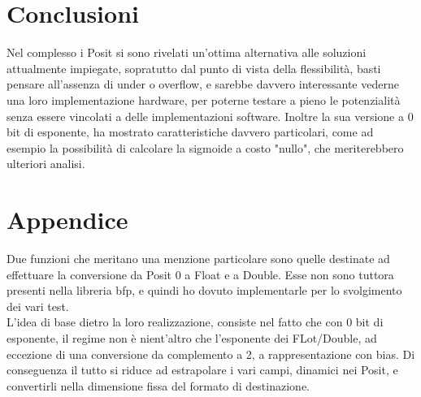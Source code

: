 \documentclass[a4paper,11pt]{article}
\begin{document}
\newpage
\section{Conclusioni}
Nel complesso i Posit si sono rivelati un'ottima alternativa alle soluzioni attualmente impiegate, sopratutto dal punto di vista della flessibilità, basti pensare all'assenza di under o overflow, e sarebbe davvero interessante vederne una loro implementazione hardware, per poterne testare a pieno le potenzialità senza essere vincolati a delle implementazioni software. Inoltre la sua versione a 0 bit di esponente, ha mostrato caratteristiche davvero particolari, come ad esempio la possibilità di calcolare la sigmoide a costo "nullo", che meriterebbero ulteriori analisi.

\newpage

\section{Appendice}
Due funzioni che meritano una menzione particolare sono quelle destinate ad effettuare la conversione da Posit 0 a Float e a Double. Esse non sono tuttora presenti nella libreria bfp\cite{libbfp}, e quindi ho dovuto implementarle per lo svolgimento dei vari test.\\ L'idea di base dietro la loro realizzazione, consiste nel fatto che con 0 bit di esponente, il regime non è nient'altro che l'esponente dei FLot/Double, ad eccezione di una conversione da complemento a 2, a rappresentazione con bias. Di conseguenza il tutto si riduce ad estrapolare i vari campi, dinamici nei Posit, e convertirli nella dimensione fissa del formato di destinazione.

\newpage
	
	\printbibliography[title=Bibliografia]

	
\end{document}
